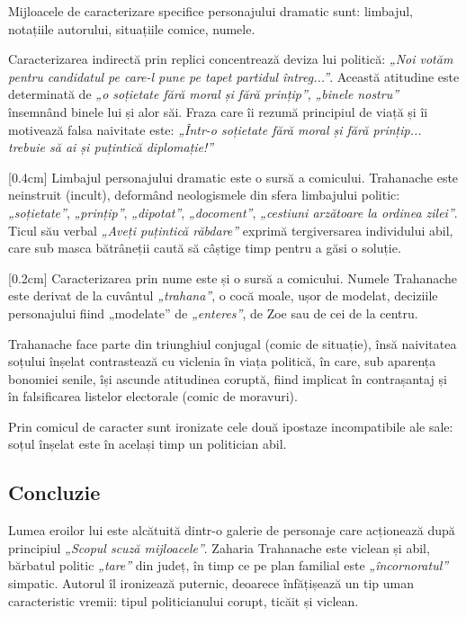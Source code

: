 Mijloacele de caracterizare specifice personajului dramatic sunt: limbajul, notațiile autorului, situațiile comice, numele.

Caracterizarea indirectă prin replici concentrează deviza lui politică: \textit{„Noi votăm pentru candidatul pe care-l pune pe tapet partidul întreg...”}. Această atitudine este determinată de \textit{„o soțietate fără moral și fără prințip”}, \textit{„binele nostru”} însemnând binele lui și alor săi. Fraza care îi rezumă principiul de viață și îi motivează falsa naivitate este: \textit{„Într-o soțietate fără moral și fără prințip... trebuie să ai și puțintică diplomație!”}

[0.4cm]
Limbajul personajului dramatic este o sursă a comicului. Trahanache este neinstruit (incult), deformând neologismele din sfera limbajului politic: \textit{„soțietate”}, \textit{„prințip”}, \textit{„dipotat”}, \textit{„docoment”}, \textit{„cestiuni arzătoare la ordinea zilei”}. Ticul său verbal \textit{„Aveți puțintică răbdare”} exprimă tergiversarea individului abil, care sub masca bătrâneții caută să câștige timp pentru a găsi o soluție.

[0.2cm]
Caracterizarea prin nume este și o sursă a comicului. Numele Trahanache este derivat de la cuvântul \textit{„trahana”}, o cocă moale, ușor de modelat, deciziile personajului fiind „modelate” de \textit{„enteres”}, de Zoe sau de cei de la centru.

Trahanache face parte din triunghiul conjugal (comic de situație), însă naivitatea soțului înșelat contrastează cu viclenia în viața politică, în care, sub aparența bonomiei senile, își ascunde atitudinea coruptă, fiind implicat în contrașantaj și în falsificarea listelor electorale (comic de moravuri).

Prin comicul de caracter sunt ironizate cele două ipostaze incompatibile ale sale: soțul înșelat este în același timp un politician abil.

\subsection{Concluzie}

Lumea eroilor lui \operaauthor este alcătuită dintr-o galerie de personaje care acționează după principiul \textit{„Scopul scuză mijloacele”}. Zaharia Trahanache este viclean și abil, bărbatul politic \textit{„tare”} din județ, în timp ce pe plan familial este \textit{„încornoratul”} simpatic. Autorul îl ironizează puternic, deoarece înfățișează un tip uman caracteristic vremii: tipul politicianului corupt, ticăit și viclean.
